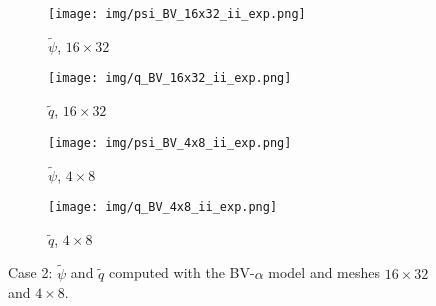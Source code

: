 \documentclass[11pt,a4paper]{article}
\begin{document}


\begin{figure}[htb!]
\centering
\begin{subfigure}{0.193\textwidth}
         \centering
         \texttt{[image: img/psi\_BV\_16x32\_ii\_exp.png]}
         \caption{\scriptsize{$\widetilde{\psi}$, $16 \times 32$}}
     \end{subfigure}
\begin{subfigure}{0.193\textwidth}
         \centering
         \texttt{[image: img/q\_BV\_16x32\_ii\_exp.png]}
         \caption{\scriptsize{$\widetilde{q}$, $16 \times 32$}}
     \end{subfigure}
\begin{subfigure}{0.193\textwidth}
         \centering
         \texttt{[image: img/psi\_BV\_4x8\_ii\_exp.png]}
         \caption{\scriptsize{$\widetilde{\psi}$, $4 \times 8$}}
     \end{subfigure}
     \begin{subfigure}{0.193\textwidth}
         \centering
         \texttt{[image: img/q\_BV\_4x8\_ii\_exp.png]}
         \caption{\scriptsize{$\widetilde{q}$, $4 \times 8$}}
     \end{subfigure}
\caption{Case 2: $\widetilde{\psi}$ and $\widetilde{q}$ computed with the BV-$\alpha$ model
and meshes $16 \times 32$ and  $4 \times 8$. }
\label{fig:BV_second_filter}
\end{figure}
\end{document}
